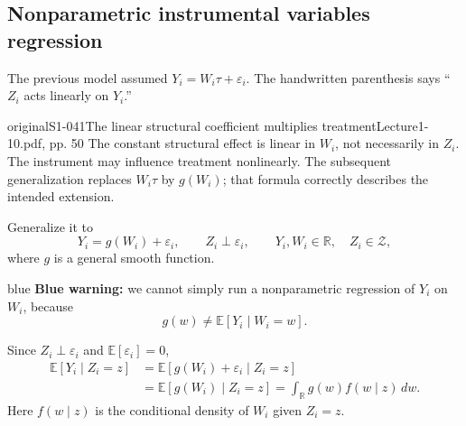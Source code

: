 \subsection{Nonparametric instrumental variables regression}
The previous model assumed $Y_i=W_i\tau+\varepsilon_i$. The handwritten parenthesis says ``$Z_i$ acts linearly on $Y_i$.''
\begin{reviewnote}{original}{S1-041}{The linear structural coefficient multiplies treatment}{Lecture1-10.pdf, pp. 50}
The constant structural effect is linear in $W_i$, not necessarily in $Z_i$. The instrument may influence treatment nonlinearly. The subsequent generalization replaces $W_i\tau$ by $g(W_i)$; that formula correctly describes the intended extension.
\end{reviewnote}
 Generalize it to
\[
 Y_i=g(W_i)+\varepsilon_i,\qquad Z_i\perp\varepsilon_i,
 \qquad Y_i,W_i\in\mathbb R,\quad Z_i\in\mathcal Z,
\]
where $g$ is a general smooth function. \begin{inkblock}{blue}
\textbf{Blue warning:} we cannot simply run a nonparametric regression of $Y_i$ on $W_i$, because
\[
 g(w)\ne\mathbb E[Y_i\mid W_i=w].
\]
\end{inkblock}



Since $Z_i\perp\varepsilon_i$ and $\mathbb E[\varepsilon_i]=0$,
\begin{align*}
 \mathbb E[Y_i\mid Z_i=z]
 &=\mathbb E[g(W_i)+\varepsilon_i\mid Z_i=z]\\
 &=\mathbb E[g(W_i)\mid Z_i=z]
 =\int_{\mathbb R}g(w)f(w\mid z)\,dw.\tag{9.15}
\end{align*}
Here $f(w\mid z)$ is the conditional density of $W_i$ given $Z_i=z$.

